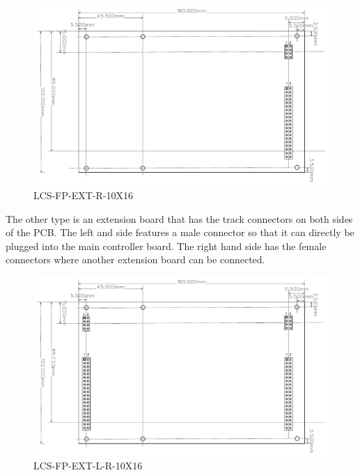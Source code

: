 \begin{figure}[htbp]
    \centering
    \includegraphics[page=1, scale=0.7]{./Figures/LCS-FP-EXT-R-10X16.pdf}
    \caption{LCS-FP-EXT-R-10X16}
\end{figure}

\FloatBarrier

The other type is an extension board that has the track connectors on both sides of the PCB. The left and side features a male connector so that it can directly be plugged into the main controller board. The right hand side has the female connectors where another extension board can be connected.   

\begin{figure}[htbp]
    \centering
    \includegraphics[page=1, scale=0.7]{./Figures/LCS-FP-EXT-L-R-10X16.pdf}
    \caption{LCS-FP-EXT-L-R-10X16}
\end{figure}

\FloatBarrier

